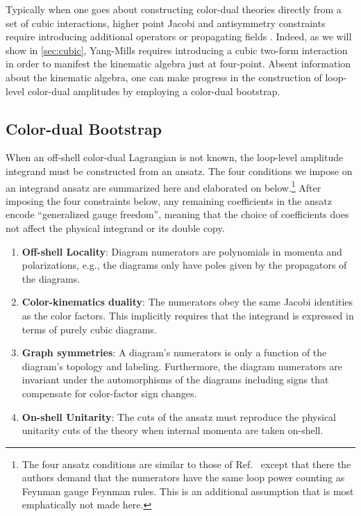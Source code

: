 \documentclass[11pt,letter]{article}
\begin{document}
Typically when one goes about constructing color-dual
theories directly from a set of cubic interactions, higher point
Jacobi and antisymmetry constraints require introducing additional operators \cite{Carrasco:2022lbm,Carrasco:2022sck} or propagating fields \cite{Ben-Shahar:2022ixa}.
Indeed, as we will show in \cref{sec:cubic}, Yang-Mills
requires introducing a cubic two-form interaction in order to manifest
the kinematic algebra just at four-point. Absent information about the
kinematic algebra, one can make progress in the construction of
loop-level color-dual amplitudes by employing a color-dual bootstrap.


\subsection{Color-dual Bootstrap}
\label{sec:bootstrap}

When an off-shell color-dual Lagrangian is not known, the loop-level
amplitude integrand must be constructed from an ansatz.  The four
conditions we impose on an integrand ansatz are summarized here and
elaborated on below.\footnote{The four ansatz conditions are similar
  to those of Ref.~\cite{Bern:2015ooa} except that there the authors
  demand that the numerators have the same loop power counting as
  Feynman gauge Feynman rules.  This is an additional assumption that
  is most emphatically not made here.}
After imposing the four constraints below, any remaining coefficients in the ansatz encode ``generalized gauge freedom'', meaning that the
choice of coefficients does not affect the physical integrand or its double copy.
\begin{enumerate}
\item \textbf{Off-shell Locality}: Diagram numerators are polynomials
  in momenta and polarizations, e.g., the diagrams only have poles given
  by the propagators of the diagrams.
\item \textbf{Color-kinematics duality}: The numerators obey the same
  Jacobi identities as the color factors.  This implicitly requires
  that the integrand is expressed in terms of purely cubic diagrams.
\item \textbf{Graph symmetries}: A diagram's numerators is only a
  function of the diagram's topology and labeling.  Furthermore, the
  diagram numerators are invariant under the automorphisms of the
  diagrams including signs that compensate for color-factor sign
    changes.
\item \textbf{On-shell Unitarity}: The cuts of the ansatz must
  reproduce the physical unitarity cuts of the theory when internal
  momenta are taken on-shell.
\end{enumerate}
\end{document}
